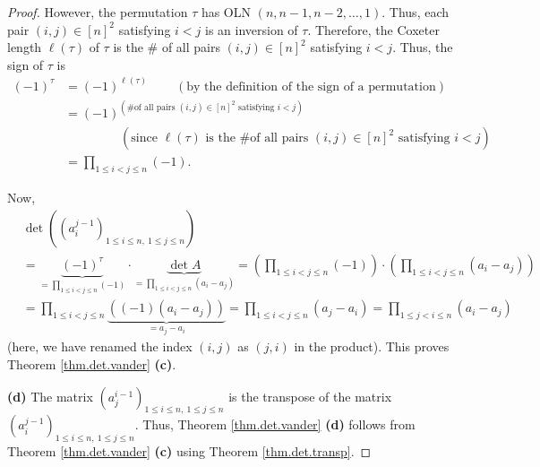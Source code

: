 \begin{proof}
However, the permutation $\tau$ has OLN $\left(  n,n-1,n-2,\ldots,1\right)  $.
Thus, each pair $\left(  i,j\right)  \in\left[  n\right]  ^{2}$ satisfying
$i<j$ is an inversion of $\tau$. Therefore, the Coxeter length $\ell\left(
\tau\right)  $ of $\tau$ is the \# of all pairs $\left(  i,j\right)
\in\left[  n\right]  ^{2}$ satisfying $i<j$. Thus, the sign of $\tau$ is%
\begin{align*}
\left(  -1\right)  ^{\tau}  &  =\left(  -1\right)  ^{\ell\left(  \tau\right)
}\ \ \ \ \ \ \ \ \ \ \left(  \text{by the definition of the sign of a
permutation}\right) \\
&  =\left(  -1\right)  ^{\left(  \text{\# of all pairs }\left(  i,j\right)
\in\left[  n\right]  ^{2}\text{ satisfying }i<j\right)  }\\
&  \ \ \ \ \ \ \ \ \ \ \ \ \ \ \ \ \ \ \ \ \left(  \text{since }\ell\left(
\tau\right)  \text{ is the \# of all pairs }\left(  i,j\right)  \in\left[
n\right]  ^{2}\text{ satisfying }i<j\right) \\
&  =\prod_{1\leq i<j\leq n}\left(  -1\right)  .
\end{align*}


Now,
\begin{align*}
&  \det\left(  \left(  a_{i}^{j-1}\right)  _{1\leq i\leq n,\ 1\leq j\leq
n}\right) \\
&  =\underbrace{\left(  -1\right)  ^{\tau}}_{=\prod_{1\leq i<j\leq n}\left(
-1\right)  }\cdot\underbrace{\det A}_{=\prod_{1\leq i<j\leq n}\left(
a_{i}-a_{j}\right)  }=\left(  \prod_{1\leq i<j\leq n}\left(  -1\right)
\right)  \cdot\left(  \prod_{1\leq i<j\leq n}\left(  a_{i}-a_{j}\right)
\right) \\
&  =\prod_{1\leq i<j\leq n}\underbrace{\left(  \left(  -1\right)  \left(
a_{i}-a_{j}\right)  \right)  }_{=a_{j}-a_{i}}=\prod_{1\leq i<j\leq n}\left(
a_{j}-a_{i}\right)  =\prod_{1\leq j<i\leq n}\left(  a_{i}-a_{j}\right)
\end{align*}
(here, we have renamed the index $\left(  i,j\right)  $ as $\left(
j,i\right)  $ in the product). This proves Theorem \ref{thm.det.vander}
\textbf{(c)}. \medskip

\textbf{(d)} The matrix $\left(  a_{j}^{i-1}\right)  _{1\leq i\leq n,\ 1\leq
j\leq n}$ is the transpose of the matrix $\left(  a_{i}^{j-1}\right)  _{1\leq
i\leq n,\ 1\leq j\leq n}$. Thus, Theorem \ref{thm.det.vander} \textbf{(d)}
follows from Theorem \ref{thm.det.vander} \textbf{(c)} using Theorem
\ref{thm.det.transp}.
\end{proof}

